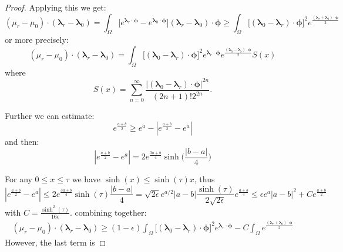 \documentclass{article}
\def\vc#1{\mathbf{\boldsymbol{#1}}}     %
\def\tn#1{\boldsymbol{#1}}
\def\abs#1{|#1|}
\def\vl{{\vc\lambda}}
\def\vmu{\vc\mu}
\def\estvmu{{\vc{\hat\mu}}}
\def\vphi{\vc\phi}
\begin{document}
\begin{proof}
% 


Applying this we get:
\[
  (\mu_r - \mu_0) \cdot (\vl_r - \vl_0) =
  \int_\Omega \Big[ e^{\vl_r\cdot\vphi} - e^{\vl_0\cdot\vphi} \Big] (\vl_r - \vl_0) \cdot \vphi 
  \ge \int_\Omega  \big[ (\vl_0 - \vl_r) \cdot \vphi \big]^2 e^\frac{(\vl_r + \vl_0) \cdot \vphi}{2}
\]
or more precisely:
\[
  (\mu_r - \mu_0) \cdot (\vl_r - \vl_0) =
  \int_\Omega  \big[ (\vl_0 - \vl_r) \cdot \vphi \big]^2 e^{\vl_r\cdot\vphi} e^\frac{(\vl_0 - \vl_r) \cdot \vphi}{2} S(x)
\]
where
\[
  S(x) = \sum_{n=0}^\infty \frac{|(\vl_0 - \vl_r) \cdot \vphi|^{2n}}{(2n+1)!2^{2n}}.
\]





Further we can estimate:
\[
    e^\frac{a + b}{2} \ge e^{a} - \abs{e^\frac{a + b}{2} - e^{a}}
\]
and then:
\[
 \abs{e^\frac{a + b}{2} - e^{a}} = 2e^\frac{3a+b}{4} \sinh\Big(\frac{|b-a|}{4}\Big)
\]

For any $0 \le x \le \tau$ we have $\sinh(x) \le \sinh(\tau) x$, thus
\[
 \abs{e^\frac{a + b}{2} - e^{a}} \le 2e^\frac{3a+b}{4} \sinh(\tau) \frac{|b-a|}{4}
 =  \sqrt{2\epsilon} e^{a/2}|a-b| \frac{\sinh(\tau)}{2\sqrt{2\epsilon}} e^{\frac{a+b}{4}}  \le 
    \epsilon e^{a}|a-b|^2 +  C e^{\frac{a+b}{2}}
\]
with $C = \frac{\sinh^2(\tau)}{16\epsilon}$.
combining together:
\begin{align*}
 (\mu_r - \mu_0) \cdot (\vl_r - \vl_0) 
 \ge (1-\epsilon)\int_\Omega  \big[ (\vl_0 - \vl_r) \cdot \vphi \big]^2 e^{\vl_r \cdot \vphi}
 -C \int_\Omega e^\frac{(\vl_r + \vl_0) \cdot \vphi}{2}
\end{align*}
However, the last term is 












\end{proof}
\end{document}
